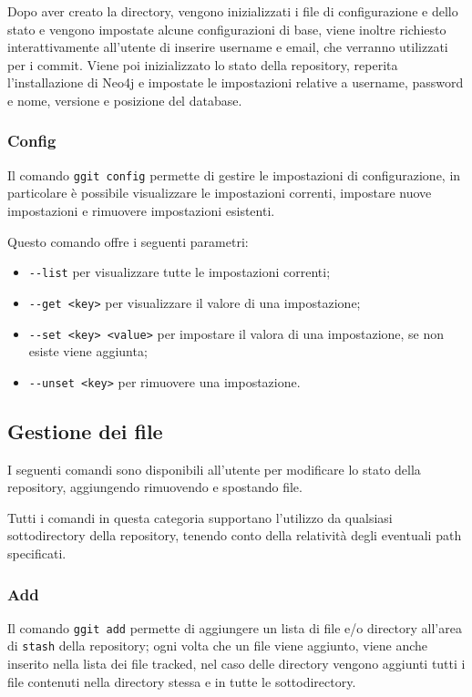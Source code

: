 Dopo aver creato la directory, vengono inizializzati i file di configurazione e dello stato e vengono impostate alcune configurazioni di base, viene inoltre richiesto interattivamente all'utente di inserire username e email, che verranno utilizzati per i commit.
Viene poi inizializzato lo stato della repository, reperita l'installazione di Neo4j e impostate le impostazioni relative a username, password e nome, versione e posizione del database.

\subsubsection{Config}
Il comando \texttt{ggit config} permette di gestire le impostazioni di configurazione, in particolare è possibile visualizzare le impostazioni correnti, impostare nuove impostazioni e rimuovere impostazioni esistenti.

Questo comando offre i seguenti parametri:
\begin{itemize}
    \item \texttt{-{}-list} per visualizzare tutte le impostazioni correnti;
    \item \texttt{-{}-get <key>} per visualizzare il valore di una impostazione;
    \item \texttt{-{}-set <key> <value>} per impostare il valora di una impostazione, se non esiste viene aggiunta;
    \item \texttt{-{}-unset <key>} per rimuovere una impostazione.
\end{itemize}

\subsection{Gestione dei file}
I seguenti comandi sono disponibili all'utente per modificare lo stato della repository, aggiungendo rimuovendo e spostando file.

Tutti i comandi in questa categoria supportano l'utilizzo da qualsiasi sottodirectory della repository, tenendo conto della relatività degli eventuali path specificati.
\subsubsection{Add}
Il comando \texttt{ggit add} permette di aggiungere un lista di file e/o directory all'area di \texttt{stash} della repository; ogni volta che un file viene aggiunto, viene anche inserito nella lista dei file tracked, nel caso delle directory vengono aggiunti tutti i file contenuti nella directory stessa e in tutte le sottodirectory.

